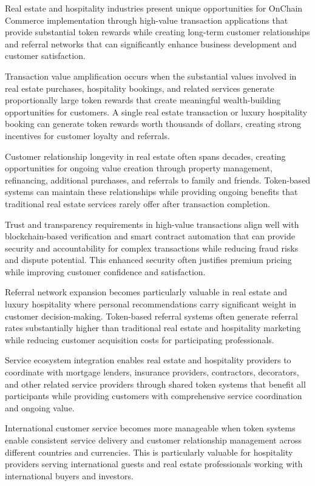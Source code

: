 \documentclass[
  Letterpaper,
]{scrbook}
\begin{document}
Real estate and hospitality industries present unique opportunities for
OnChain Commerce implementation through high-value transaction
applications that provide substantial token rewards while creating
long-term customer relationships and referral networks that can
significantly enhance business development and customer satisfaction.

Transaction value amplification occurs when the substantial values
involved in real estate purchases, hospitality bookings, and related
services generate proportionally large token rewards that create
meaningful wealth-building opportunities for customers. A single real
estate transaction or luxury hospitality booking can generate token
rewards worth thousands of dollars, creating strong incentives for
customer loyalty and referrals.

Customer relationship longevity in real estate often spans decades,
creating opportunities for ongoing value creation through property
management, refinancing, additional purchases, and referrals to family
and friends. Token-based systems can maintain these relationships while
providing ongoing benefits that traditional real estate services rarely
offer after transaction completion.

Trust and transparency requirements in high-value transactions align
well with blockchain-based verification and smart contract automation
that can provide security and accountability for complex transactions
while reducing fraud risks and dispute potential. This enhanced security
often justifies premium pricing while improving customer confidence and
satisfaction.

Referral network expansion becomes particularly valuable in real estate
and luxury hospitality where personal recommendations carry significant
weight in customer decision-making. Token-based referral systems often
generate referral rates substantially higher than traditional real
estate and hospitality marketing while reducing customer acquisition
costs for participating professionals.

Service ecosystem integration enables real estate and hospitality
providers to coordinate with mortgage lenders, insurance providers,
contractors, decorators, and other related service providers through
shared token systems that benefit all participants while providing
customers with comprehensive service coordination and ongoing value.

International customer service becomes more manageable when token
systems enable consistent service delivery and customer relationship
management across different countries and currencies. This is
particularly valuable for hospitality providers serving international
guests and real estate professionals working with international buyers
and investors.
\end{document}
